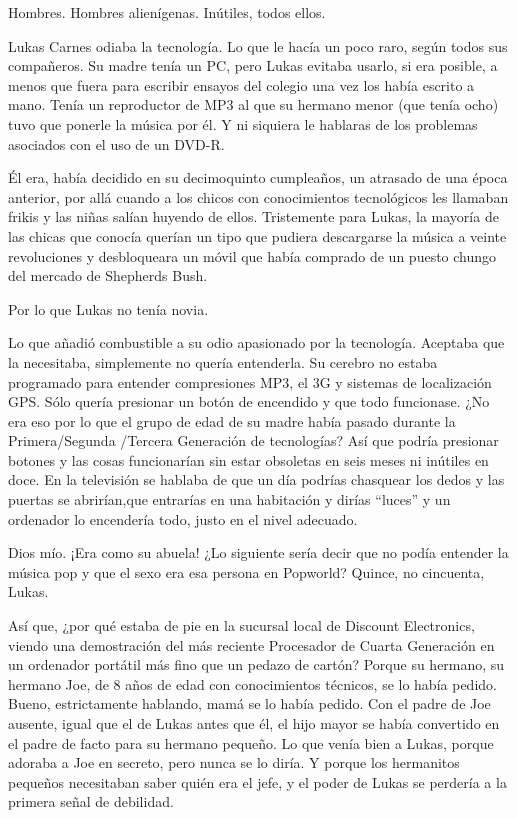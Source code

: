 Hombres. Hombres alienígenas. Inútiles, todos ellos.

Lukas Carnes odiaba la tecnología. Lo que le hacía un poco raro, según
todos sus compañeros. Su madre tenía un PC, pero Lukas evitaba usarlo,
si era posible, a menos que fuera para escribir ensayos del colegio una
vez los había escrito a mano. Tenía un reproductor de MP3 al que su
hermano menor (que tenía ocho) tuvo que ponerle la música por él. Y ni
siquiera le hablaras de los problemas asociados con el uso de un DVD-R.

Él era, había decidido en su decimoquinto cumpleaños, un atrasado de una
época anterior, por allá cuando a los chicos con conocimientos
tecnológicos les llamaban frikis y las niñas salían huyendo de ellos.
Tristemente para Lukas, la mayoría de las chicas que conocía querían un
tipo que pudiera descargarse la música a veinte revoluciones y
desbloqueara un móvil que había comprado de un puesto chungo del mercado
de Shepherds Bush.

Por lo que Lukas no tenía novia.

Lo que añadió combustible a su odio apasionado por la tecnología.
Aceptaba que la necesitaba, simplemente no quería entenderla. Su cerebro
no estaba programado para entender compresiones MP3, el 3G y sistemas de
localización GPS. Sólo quería presionar un botón de encendido y que todo
funcionase. ¿No era eso por lo que el grupo de edad de su madre había
pasado durante la Primera/Segunda /Tercera Generación de tecnologías?
Así que podría presionar botones y las cosas funcionarían sin estar
obsoletas en seis meses ni inútiles en doce. En la televisión se hablaba
de que un día podrías chasquear los dedos y las puertas se abrirían,que
entrarías en una habitación y dirías ``luces'' y un ordenador lo
encendería todo, justo en el nivel adecuado.

Dios mío. ¡Era como su abuela! ¿Lo siguiente sería decir que no podía
entender la música pop y que el sexo era esa persona en Popworld?
Quince, no cincuenta, Lukas.

Así que, ¿por qué estaba de pie en la sucursal local de Discount
Electronics, viendo una demostración del más reciente Procesador de
Cuarta Generación en un ordenador portátil más fino que un pedazo de
cartón? Porque su hermano, su hermano Joe, de 8 años de edad con
conocimientos técnicos, se lo había pedido. Bueno, estrictamente
hablando, mamá se lo había pedido. Con el padre de Joe ausente, igual
que el de Lukas antes que él, el hijo mayor se había convertido en el
padre de facto para su hermano pequeño. Lo que venía bien a Lukas,
porque adoraba a Joe en secreto, pero nunca se lo diría. Y porque los
hermanitos pequeños necesitaban saber quién era el jefe, y el poder de
Lukas se perdería a la primera señal de debilidad.

